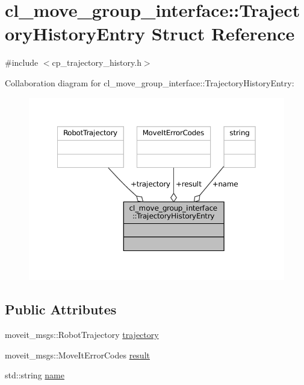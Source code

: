 \hypertarget{structcl__move__group__interface_1_1TrajectoryHistoryEntry}{}\section{cl\+\_\+move\+\_\+group\+\_\+interface\+:\+:Trajectory\+History\+Entry Struct Reference}
\label{structcl__move__group__interface_1_1TrajectoryHistoryEntry}


{\ttfamily \#include $<$cp\+\_\+trajectory\+\_\+history.\+h$>$}



Collaboration diagram for cl\+\_\+move\+\_\+group\+\_\+interface\+:\+:Trajectory\+History\+Entry\+:
\nopagebreak
\begin{figure}[H]
\begin{center}
\leavevmode
\includegraphics[width=350pt]{structcl__move__group__interface_1_1TrajectoryHistoryEntry__coll__graph}
\end{center}
\end{figure}
\subsection*{Public Attributes}
\begin{DoxyCompactItemize}
\item 
moveit\+\_\+msgs\+::\+Robot\+Trajectory \hyperlink{structcl__move__group__interface_1_1TrajectoryHistoryEntry_ac8c522a778fd0779f9550a6a77a4bd02}{trajectory}
\item 
moveit\+\_\+msgs\+::\+Move\+It\+Error\+Codes \hyperlink{structcl__move__group__interface_1_1TrajectoryHistoryEntry_a1859250a44110dc27006a33031fca538}{result}
\item 
std\+::string \hyperlink{structcl__move__group__interface_1_1TrajectoryHistoryEntry_a13d89747b003f2235df3609998e83c32}{name}
\end{DoxyCompactItemize}


